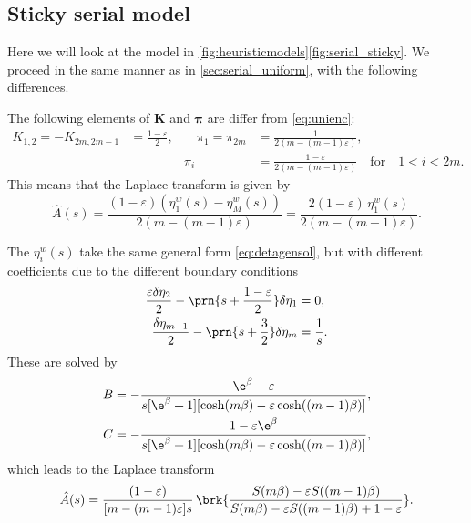 \documentclass[12pt]{article}
\newcommand{\eqm}{\pi}
\newcommand{\eq}{\boldsymbol{\eqm}}
\newcommand{\etwm}{\eta^w}
\newcommand{\encm}{K}
\newcommand{\enc}{\mathbf{\encm}}
\begin{document}
\subsection{Sticky serial model}\label{sec:serial_sticky}

Here we will look at the model in \cref{fig:heuristicmodels}\ref{fig:serial_sticky}.
We proceed in the same manner as in \cref{sec:serial_uniform}, with the following differences.

The following elements of \(\enc\) and \(\eq\) are differ from \eqref{eq:unienc}:
%
\begin{equation}\label{eq:stickyenc}
  \begin{aligned}
  \encm_{1,2} = -\encm_{2m,2m-1} &= \frac{1-\varepsilon}{2},
  &\quad
  \eqm_1 = \eqm_{2m} &= \frac{1}{2(m-(m-1)\varepsilon)},
  \\ &&
  \eqm_i &=  \frac{1-\varepsilon}{2(m-(m-1)\varepsilon)}
  \quad\text{for}\quad 1<i<2m.
  \end{aligned}
\end{equation}
%
This means that the Laplace transform is given by
%
\begin{equation}\label{eq:stickyareaeta}
  \hat{A}(s) = \frac{(1-\varepsilon)(\etwm_1(s)-\etwm_M(s))}
                    {2(m-(m-1)\varepsilon)}
       = \frac{2(1-\varepsilon)\, \etwm_1(s)}{2(m-(m-1)\varepsilon)}.
\end{equation}
%

The \(\etwm_i(s)\) take the same general form \eqref{eq:detagensol}, but with different coefficients due to the different boundary conditions
%
\begin{equation}\label{eq:detabndsticky}
\begin{aligned}
  \frac{\varepsilon\delta\eta_2}{2} - \prn{s+\frac{1-\varepsilon}{2}}\delta\eta_1 &= 0, \\
  \frac{\delta\eta_{m-1}}{2} - \prn{s+\frac{3}{2}}\delta\eta_{m} &= \frac{1}{s}.
\end{aligned}
\end{equation}
%
These are solved by
%
\begin{equation}\label{eq:stickycoeffs}
\begin{aligned}
  B &= -\frac{\e^{\beta} - \varepsilon}
      {s [\e^{\beta} + 1] [\cosh(m\beta) - \varepsilon \cosh((m-1)\beta)]}, \\
  C &= -\frac{1 - \varepsilon\e^{\beta}}
      {s [\e^{\beta} + 1] [\cosh(m\beta) - \varepsilon \cosh((m-1)\beta)]},
\end{aligned}
\end{equation}
%
which leads to the Laplace transform
%
\begin{equation}\label{eq:stickylaplace}
  \hat{A}(s) = \frac{(1-\varepsilon)}{[m-(m-1)\varepsilon]s} \,
      \brk{\frac{S(m\beta) - \varepsilon S((m-1)\beta)}
      {S(m\beta) - \varepsilon S((m-1)\beta) + 1 - \varepsilon}}.
\end{equation}
%
\end{document}
